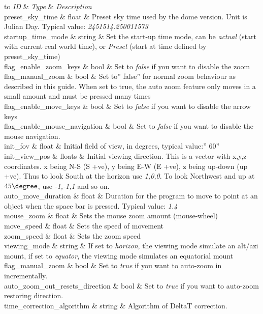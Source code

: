 \begin{longtabu} to \textwidth {l|l|X}
\toprule
\emph{ID} & \emph{Type} & \emph{Description}\\
\midrule
preset\_sky\_time & float & Preset sky time used by the
dome version. Unit is Julian Day. Typical value:
\emph{2451514.250011573}\\
\midrule
startup\_time\_mode & string & Set the start-up time mode,
can be \emph{actual} (start with current real world time), or
\emph{Preset} (start at time defined by
preset\_sky\_time)\\
\midrule
flag\_enable\_zoom\_keys & bool & Set to \emph{false} if
you want to disable the zoom\\
\midrule
flag\_manual\_zoom & bool & Set to'' false'' for normal
zoom behaviour as described in this guide. When set to true, the auto
zoom feature only moves in a small amount and must be pressed many
times\\
\midrule
flag\_enable\_move\_keys & bool & Set to \emph{false} if
you want to disable the arrow keys\\
\midrule
flag\_enable\_mouse\_navigation & bool & Set to
\emph{false} if you want to disable the mouse navigation.\\
\midrule
init\_fov & float & Initial field of view, in degrees,
typical value:'' 60''\\
\midrule
init\_view\_pos & floats & Initial viewing direction. This
is a vector with x,y,z-coordinates. x being N-S (S +ve), y being E-W (E
+ve), z being up-down (up +ve). Thus to look South at the horizon use
\emph{1,0,0}. To look Northwest and up at $45\degree$, use \emph{-1,-1,1} and so
on.\\
\midrule
auto\_move\_duration & float & Duration for the program to
move to point at an object when the space bar is pressed. Typical value:
\emph{1.4}\\
\midrule
mouse\_zoom & float & Sets the mouse zoom amount
(mouse-wheel)\\
\midrule
move\_speed & float & Sets the speed of
movement\\
\midrule
zoom\_speed & float & Sets the zoom speed\\
\midrule
viewing\_mode & string & If set to \emph{horizon}, the
viewing mode simulate an alt/azi mount, if set to \emph{equator}, the
viewing mode simulates an equatorial mount\\
\midrule
flag\_manual\_zoom & bool & Set to \emph{true} if you want
to auto-zoom in incrementally.\\
\midrule
auto\_zoom\_out\_resets\_direction & bool & Set to
\emph{true} if you want to auto-zoom restoring direction.\\
\midrule
time\_correction\_algorithm & string & Algorithm of DeltaT
correction.\\
\bottomrule
\end{longtabu}

